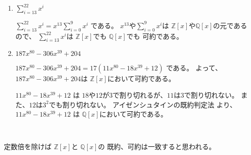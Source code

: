 \documentclass[12pt,b5paper]{ltjsarticle}
\begin{document}
\begin{enumerate}
 \item $\sum_{i=13}^{22}x^i$

       $\sum_{i=13}^{22}x^i = x^{13}\sum_{i=0}^{9}x^i$
       である。
       $x^{13}$や$\sum_{i=0}^{9}x^i$は
       $\mathbb{Z}[x]$や$\mathbb{Q}[x]$の元であるので、
       $\sum_{i=13}^{22}x^i$は
       $\mathbb{Z}[x]$でも
       $\mathbb{Q}[x]$でも
       可約である。


 \item $187x^{80}-306x^{39}+204$

       $187x^{80}-306x^{39}+204 = 17(11x^{80}-18x^{39}+12)$
       である。
       よって、
       $187x^{80}-306x^{39}+204$は
       $\mathbb{Z}[x]$において可約である。

       $11x^{80}-18x^{39}+12$
       は
       $18$や$12$が$3$で割り切れるが、$11$は$3$で割り切れない。
       また、$12$は$3^2$でも割り切れない。
       アイゼンシュタインの既約判定法
       より、
       $11x^{80}-18x^{39}+12$
       は
       $\mathbb{Q}[x]$において可約である。

\end{enumerate}

\hrulefill\

\begin{center}
    定数倍を除けば
    $\mathbb{Z}[x]$と
    $\mathbb{Q}[x]$の
    既約、可約は一致すると思われる。
\end{center}
\end{document}
